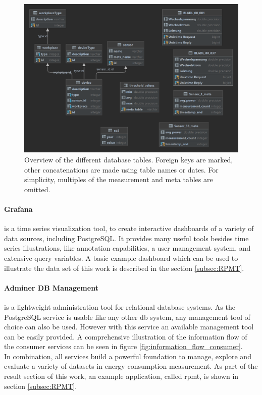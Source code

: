 \begin{figure}[ht]
	\centering
	\includegraphics[width=\textwidth]{images/diagram.png}
	\caption{Overview of the different database tables. Foreign keys are marked, other concatenations are made using table names or dates. For simplicity, multiples of the measurement and meta tables are omitted.}
	\label{db_tables}
\end{figure}

\paragraph{Grafana} is a time series visualization tool, to create interactive dashboards of a variety of data sources, including PostgreSQL. It provides many useful tools besides time series illustrations, like annotation capabilities, a user management system, and extensive query variables. A basic example dashboard which can be used to illustrate the data set of this work is described in the section \ref{subsec:RPMT}.

\paragraph{Adminer DB Management} is a lightweight administration tool for relational database systems. As the PostgreSQL service is usable like any other db system, any management tool of choice can also be used. However with this service an available management tool can be easily provided. A comprehensive illustration of the information flow of the consumer services can be seen in figure \ref{fig:information_flow_consumer}.\\
In combination, all services build a powerful foundation to manage, explore and evaluate a variety of datasets in energy consumption measurement. As part of the result section of this work, an example application, called \acrfull{rpmt}, is shown in section \ref{subsec:RPMT}.

